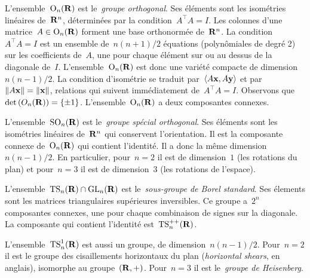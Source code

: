 L'ensemble~$\mathrm{O}_n(\mathbf{R})$ est le~\emph{groupe orthogonal}.
Ses éléments sont les isométries linéaires de~$\mathbf{R}^n$, déterminées par la
condition~$A^\top A=I$.  Les colonnes d'une matrice~$A\in\mathrm{O}_n(\mathbf{R})$ forment
une base orthonormée de~$\mathbf{R}^n$.  La condition~$A^\top A=I$ est un ensemble
de~$n(n+1)/2$ équations (polynômiales de degré 2) sur les coefficients
de~$A$, une pour chaque élément sur ou au dessus de la diagonale de~$I$.
L'ensemble~$\mathrm{O}_n(\mathbf{R})$ est donc une variété compacte de dimension~$n(n-1)/2$.
La condition d'isométrie se traduit par~$\left\langle A\mathbf{x},A\mathbf{y}\right\rangle$ et
par~$\left\|A\mathbf{x}\right\|=\left\|\mathbf{x}\right\|$, relations qui suivent immédiatement de~$A^\top A=I$.
Observons que~$\textrm{det}\left(O_n(\mathbf{R})\right)=\left\{\pm 1\right\}$.
L'ensemble~$\mathrm{O}_n(\mathbf{R})$ a deux composantes connexes.

L'ensemble~$\mathrm{SO}_n(\mathbf{R})$ est le~\emph{groupe spécial orthogonal}.  Ses éléments
sont les isométries linéaires de~$\mathbf{R}^n$ qui conservent l'orientation.  Il est
la composante connexe de~$\mathrm{O}_n(\mathbf{R})$ qui contient l'identité.  Il a donc la
même dimension~$n(n-1)/2$.  En particulier, pour~$n=2$ il est de
dimension~$1$ (les rotations du plan) et pour~$n=3$ il est de dimension~$3$
(les rotations de l'espace).

L'ensemble~$\mathrm{TS}_n(\mathbf{R})\cap\mathrm{GL}_n(\mathbf{R})$ est le~\emph{sous-groupe de Borel
standard}.  Ses élements sont les matrices triangulaires supérieures
inversibles.  Ce groupe a~$2^n$ composantes connexes, une pour chaque
combinaison de signes sur la diagonale.  La composante qui contient
l'identité est~$\mathrm{TS}_n^{++}(\mathbf{R})$.

L'ensemble~$\mathrm{TS}^1_n(\mathbf{R})$ est aussi un groupe, de dimension~$n(n-1)/2$.
Pour~$n=2$ il est le groupe des cisaillements horizontaux du plan
(\emph{horizontal shears}, en anglais), isomorphe au groupe~$(\mathbf{R},+)$.
Pour~$n=3$ il est le~\emph{groupe de Heisenberg}.

